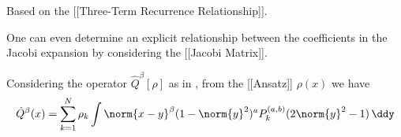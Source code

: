 Based on the {[}{[}Three-Term Recurrence Relationship{]}{]}.

One can even determine an explicit relationship between the coefficients
in the Jacobi expansion by considering the {[}{[}Jacobi Matrix{]}{]}.

Considering the operator $\hat{Q}^\beta[\rho]$ as in , from the [[Ansatz]] $\rho(x)$ we have
$$\hat{Q}^{\beta}(x) = \sum_{k=1}^{N} \rho_{k} \int \norm{x-y}^{\beta}(1-\norm{y}^2)^{a}P_{k}^{(a, b)}(2\norm{y}^{2}- 1) \,\ddy$$
